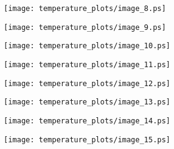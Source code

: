 \documentclass[11pt]{amsart}
\theoremstyle{plain}%
\theoremstyle{definition}
\theoremstyle{remark}
\numberwithin{equation}{thm}
\begin{document}
\begin{figure}[H]
\begin{center}
\texttt{[image: temperature\_plots/image\_8.ps]} 
\end{center}
\end{figure}

\begin{figure}[H]
\begin{center}
\texttt{[image: temperature\_plots/image\_9.ps]} 
\end{center}
\end{figure}

\begin{figure}[H]
\begin{center}
\texttt{[image: temperature\_plots/image\_10.ps]} 
\end{center}
\end{figure}

\begin{figure}[H]
\begin{center}
\texttt{[image: temperature\_plots/image\_11.ps]} 
\end{center}
\end{figure}

\begin{figure}[H]
\begin{center}
\texttt{[image: temperature\_plots/image\_12.ps]} 
\end{center}
\end{figure}

\begin{figure}[H]
\begin{center}
\texttt{[image: temperature\_plots/image\_13.ps]} 
\end{center}
\end{figure}

\begin{figure}[H]
\begin{center}
\texttt{[image: temperature\_plots/image\_14.ps]} 
\end{center}
\end{figure}

\begin{figure}[H]
\begin{center}
\texttt{[image: temperature\_plots/image\_15.ps]} 
\end{center}
\end{figure}
\end{document}
